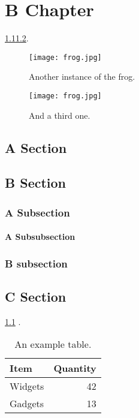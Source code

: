 \chapter{B Chapter}

\lipsum[1] \ref{fig:frogger}\ref{fig:froggerr}.

\begin{figure}
    \centering
    \caption{\label{fig:frogger}Another instance of the frog.}
    \texttt{[image: frog.jpg]}
\end{figure}
\begin{figure}
    \centering
    \caption{\label{fig:froggerr}And a third one.}
    \texttt{[image: frog.jpg]}
\end{figure}

\section{A Section}

\lipsum[2]

\section{B Section}

\subsection{A Subsection}
\lipsum[3]
\subsubsection{A Subsubsection}
\lipsum[4]
\subsection{B subsection}
\lipsum[5]

\section{C Section}
\lipsum[6-8] \ref{tab:widgetss} \cite{One, Two, Three}.

\begin{table}
    \centering
    \caption{\label{tab:widgetss}An example table.}
    \begin{tabular}{l|r}
        Item & Quantity \\\hline
        Widgets & 42 \\
        Gadgets & 13
    \end{tabular}
\end{table}

